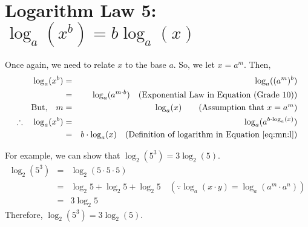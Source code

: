 
\section{Logarithm Law 5: $\log_{a}(x^b) = b \log_{a}(x)$}
Once again, we need to relate $x$ to the base $a$. So, we let $x=a^m$. Then,
\begin{eqnarray*}
\log_{a}(x^b)&=&\log_{a}((a^m)^b)\\
&=&\log_{a}(a^{m \cdot b}) \quad \mbox{(Exponential Law in Equation (Grade 10))}\\
\mbox{But,}\quad m &=& \log_{a}(x)\quad \quad \mbox{(Assumption that $x=a^m$)}\\
\therefore \quad \log_{a}(x^b)&=&\log_{a}(a^{b \cdot \log_{a}(x)})\\
&=&b \cdot \log_{a}(x) \quad \mbox{(Definition of logarithm in Equation~\ref{eq:mn:l})}
\end{eqnarray*}

For example, we can show that $\log_{2}(5^3) = 3 \log_{2}(5)$.
\begin{eqnarray*}
\log_{2}(5^3) &=& \log_2 (5 \cdot 5 \cdot 5)\\
&=& \log_2 5 + \log_2 5 + \log_2 5\quad (\because \log_{a}(x \cdot y)=\log_{a}(a^m \cdot a^n))\\
&=&3 \log_2 5
\end{eqnarray*}
Therefore, $\log_{2}(5^3) = 3 \log_{2}(5)$.


